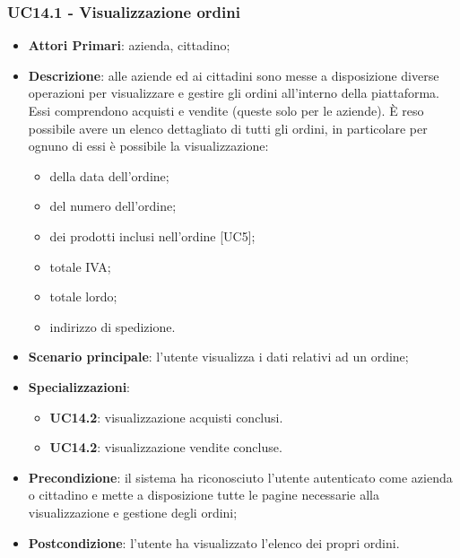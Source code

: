 \subsubsection{UC14.1 - Visualizzazione ordini}
\begin{itemize}
	\item \textbf{Attori Primari}: azienda, cittadino;
	\item \textbf{Descrizione}: alle aziende ed ai cittadini sono messe a disposizione diverse operazioni per visualizzare e gestire gli ordini all'interno della piattaforma. Essi comprendono acquisti e vendite (queste solo per le aziende). \`E reso possibile avere un elenco dettagliato di tutti gli ordini, in particolare per ognuno di essi è possibile la visualizzazione:
	\begin{itemize}
		\item della data dell'ordine;
		\item del numero dell'ordine;
		\item dei prodotti inclusi nell'ordine [UC5];
		\item totale IVA;
		\item totale lordo\glo;
		\item indirizzo di spedizione.
	\end{itemize}
	\item \textbf{Scenario principale}: l'utente visualizza i dati relativi ad un ordine;
	\item \textbf{Specializzazioni}:
	\begin{itemize}
		\item \textbf{UC14.2}: visualizzazione acquisti conclusi.
		\item \textbf{UC14.2}: visualizzazione vendite concluse.
	\end{itemize}
	\item \textbf{Precondizione}: il sistema ha riconosciuto l'utente autenticato come azienda o cittadino e mette a disposizione tutte le pagine necessarie alla visualizzazione e gestione degli ordini;
	\item \textbf{Postcondizione}: l'utente ha visualizzato l'elenco dei propri ordini.
\end{itemize} 



